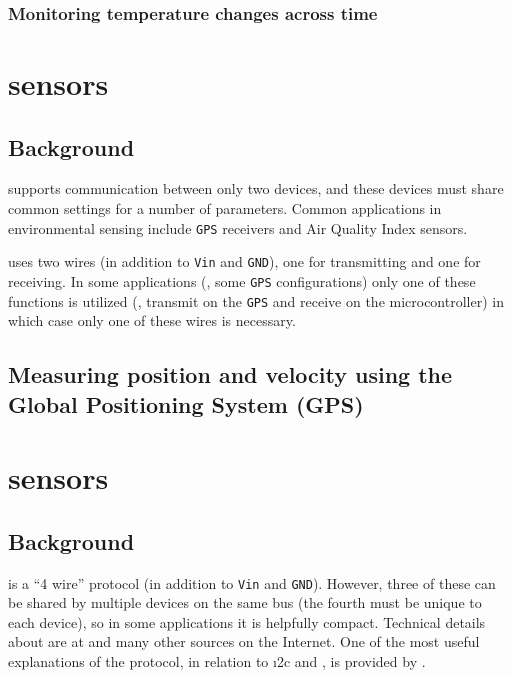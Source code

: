 \subsubsection{\color{gray} Monitoring temperature changes across time \color{black}}



\section{\color{gray}\uart sensors \color{black}}
\subsection{\color{gray} Background \color{black}}
	\uart supports communication between only two devices, and these devices must share common settings for a number of parameters. %
Common applications in environmental sensing include \texttt{GPS} receivers and Air Quality Index sensors.

\uart uses two wires (in addition to \texttt{Vin} and \texttt{GND}), one for transmitting and one for receiving.
In some applications (\eg, some \texttt{GPS} configurations) only one of these functions is utilized (\eg, transmit on the \texttt{GPS} and receive on the microcontroller) in which case only one of these wires is necessary.
\subsection{\color{gray} Measuring position and velocity using the Global Positioning System (GPS) \color{black}}


\section{\spi sensors}
\subsection{Background}
\spi is a ``4 wire'' protocol (in addition to \texttt{Vin} and \texttt{GND}).
However, three of these can be shared by multiple devices on the same \spi bus (the fourth must be unique to each device), so in some applications it is helpfully compact.
Technical details about \spi are at  and many other sources on the Internet.
One of the most useful explanations of the \spi protocol, in relation to \i2c and \uart, is provided by .

